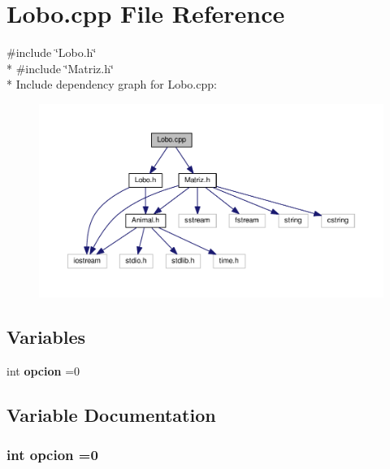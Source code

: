\section{Lobo.\-cpp File Reference}
\label{_lobo_8cpp}
{\ttfamily \#include \char`\"{}Lobo.\-h\char`\"{}}\\*
{\ttfamily \#include \char`\"{}Matriz.\-h\char`\"{}}\\*
Include dependency graph for Lobo.\-cpp\-:
\nopagebreak
\begin{figure}[H]
\begin{center}
\leavevmode
\includegraphics[width=350pt]{_lobo_8cpp__incl}
\end{center}
\end{figure}
\subsection*{Variables}
\begin{DoxyCompactItemize}
\item 
int {\bf opcion} =0
\end{DoxyCompactItemize}


\subsection{Variable Documentation}
\subsubsection[{opcion}]{\setlength{\rightskip}{0pt plus 5cm}int opcion =0}\label{_lobo_8cpp_a39f485a4773f634607a5caf635218a32}
